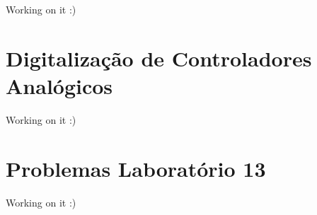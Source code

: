 \documentclass[
]{book}
\theoremstyle{definition}
\theoremstyle{definition}
\theoremstyle{definition}
\theoremstyle{remark}
\begin{document}
Working on it :)

\hypertarget{digitalizauxe7uxe3o-de-controladores-analuxf3gicos}{%
\chapter{Digitalização de Controladores Analógicos}\label{digitalizauxe7uxe3o-de-controladores-analuxf3gicos}}

Working on it :)

\hypertarget{problemas-laboratuxf3rio-13}{%
\chapter*{Problemas Laboratório 13}\label{problemas-laboratuxf3rio-13}}

Working on it :)

  
\end{document}
